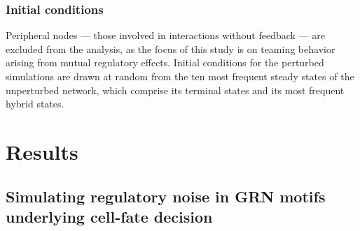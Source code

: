 \documentclass[11pt]{article}
\providecommand{\DIFaddtex}[1]{{\protect\color{red}#1}} %
\providecommand{\DIFdeltex}[1]{} %
\providecommand{\DIFaddbegin}{} %
\providecommand{\DIFaddend}{} %
\providecommand{\DIFdelbegin}{} %
\providecommand{\DIFdelend}{} %
\providecommand{\DIFadd}[1]{\texorpdfstring{\DIFaddtex{#1}}{#1}} %
\providecommand{\DIFdel}[1]{\texorpdfstring{\DIFdeltex{#1}}{}} %
\providecommand{\DIFaddincludegraphics}[2][]{\DIFOincludegraphics[#1]{#2}} %
\providecommand{\DIFdelincludegraphics}[2][]{}
\DeclareRobustCommand{\DIFaddbegin}{\DIFOaddbegin \let\includegraphics\DIFaddincludegraphics} %
\DeclareRobustCommand{\DIFaddend}{\DIFOaddend \let\includegraphics\DIFOincludegraphics} %
\DeclareRobustCommand{\DIFdelbegin}{\DIFOdelbegin \let\includegraphics\DIFdelincludegraphics} %
\DeclareRobustCommand{\DIFdelend}{\DIFOaddend \let\includegraphics\DIFOincludegraphics} %
\begin{document}
\subsubsection{Initial conditions}

Peripheral nodes — those involved in interactions without feedback — are excluded from the analysis, as the focus of this study is on teaming behavior arising from mutual regulatory effects. Initial conditions \DIFdelbegin \DIFdel{are drawn from the }\DIFdelend \DIFaddbegin \DIFadd{for the perturbed simulations are drawn at random from the ten most frequent steady states of the unperturbed network, which comprise its }\DIFaddend terminal states and \DIFdelbegin \DIFdel{the most dominant hybrid statesidentified in the unperturbed network's steady-state distribution}\DIFdelend \DIFaddbegin \DIFadd{its most frequent hybrid states}\DIFaddend .


\section{Results}

\subsection{Simulating regulatory noise in GRN motifs underlying cell-fate decision}
\end{document}

